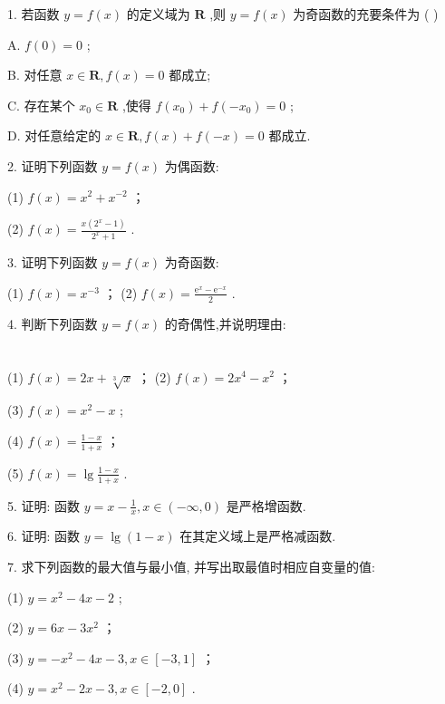 \documentclass[10pt]{article}
\begin{document}
1. 若函数 \(y = f\left( x\right)\) 的定义域为 \(\mathbf{R}\) ,则 \(y = f\left( x\right)\) 为奇函数的充要条件为 ( )

A. \(f\left( 0\right)  = 0\) ;

B. 对任意 \(x \in  \mathbf{R},f\left( x\right)  = 0\) 都成立;

C. 存在某个 \({x}_{0} \in  \mathbf{R}\) ,使得 \(f\left( {x}_{0}\right)  + f\left( {-{x}_{0}}\right)  = 0\) ;

D. 对任意给定的 \(x \in  \mathbf{R},f\left( x\right)  + f\left( {-x}\right)  = 0\) 都成立.

2. 证明下列函数 \(y = f\left( x\right)\) 为偶函数:

(1) \(f\left( x\right)  = {x}^{2} + {x}^{-2}\) ；

(2) \(f\left( x\right)  = \frac{x\left( {{2}^{x} - 1}\right) }{{2}^{x} + 1}\) .

3. 证明下列函数 \(y = f\left( x\right)\) 为奇函数:

(1) \(f\left( x\right)  = {x}^{-3}\) ； (2) \(f\left( x\right)  = \frac{{\mathrm{e}}^{x} - {\mathrm{e}}^{-x}}{2}\) .

4. 判断下列函数 \(y = f\left( x\right)\) 的奇偶性,并说明理由:

\section*{}



(1) \(f\left( x\right)  = {2x} + \sqrt[3]{x}\) ； (2) \(f\left( x\right)  = 2{x}^{4} - {x}^{2}\) ；

(3) \(f\left( x\right)  = {x}^{2} - x\) ;

(4) \(f\left( x\right)  = \frac{1 - x}{1 + x}\) ；

(5) \(f\left( x\right)  = \lg \frac{1 - x}{1 + x}\) .

5. 证明: 函数 \(y = x - \frac{1}{x},x \in  \left( {-\infty ,0}\right)\) 是严格增函数.

6. 证明: 函数 \(y = \lg \left( {1 - x}\right)\) 在其定义域上是严格减函数.

7. 求下列函数的最大值与最小值, 并写出取最值时相应自变量的值:

(1) \(y = {x}^{2} - {4x} - 2\) ;

(2) \(y = {6x} - 3{x}^{2}\) ；

(3) \(y =  - {x}^{2} - {4x} - 3,x \in  \left\lbrack  {-3,1}\right\rbrack\) ；

(4) \(y = {x}^{2} - {2x} - 3,x \in  \left\lbrack  {-2,0}\right\rbrack\) .
\end{document}
